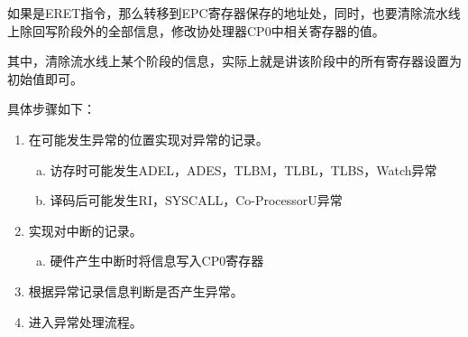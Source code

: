 如果是ERET指令，那么转移到EPC寄存器保存的地址处，同时，也要清除流水线上除回写阶段外的全部信息，修改协处理器CP0中相关寄存器的值。

其中，清除流水线上某个阶段的信息，实际上就是讲该阶段中的所有寄存器设置为初始值即可。

具体步骤如下：

\begin{enumerate}[(1)]
	\item 在可能发生异常的位置实现对异常的记录。
	
	\begin{enumerate}[(a)]
		\item 访存时可能发生ADEL，ADES，TLBM，TLBL，TLBS，Watch异常
		
		\item 译码后可能发生RI，SYSCALL，Co-ProcessorU异常
	\end{enumerate}
	\item 实现对中断的记录。
	
	\begin{enumerate}[(a)]
		\item 硬件产生中断时将信息写入CP0寄存器
	\end{enumerate}
	
	\item 根据异常记录信息判断是否产生异常。
	
	\item 进入异常处理流程。
	
\end{enumerate}